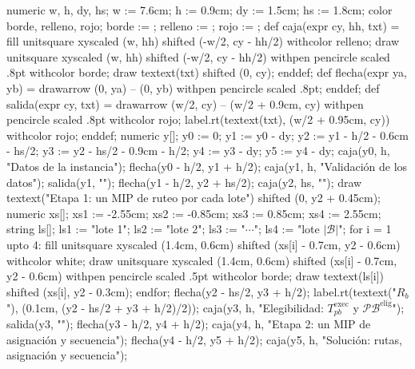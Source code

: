 {\startMPcode
numeric w, h, dy, hs; w := 7.6cm; h := 0.9cm; dy := 1.5cm; hs := 1.8cm;
color borde, relleno, rojo;
borde := ; relleno := ; rojo := ;
def caja(expr cy, hh, txt) =
  fill unitsquare xyscaled (w, hh) shifted (-w/2, cy - hh/2) withcolor relleno;
  draw unitsquare xyscaled (w, hh) shifted (-w/2, cy - hh/2) withpen pencircle scaled .8pt withcolor borde;
  draw textext(txt) shifted (0, cy);
enddef;
def flecha(expr ya, yb) =
  drawarrow (0, ya) -- (0, yb) withpen pencircle scaled .8pt;
enddef;
def salida(expr cy, txt) =
  drawarrow (w/2, cy) -- (w/2 + 0.9cm, cy) withpen pencircle scaled .8pt withcolor rojo;
  label.rt(textext(txt), (w/2 + 0.95cm, cy)) withcolor rojo;
enddef;
numeric y[];
y0 := 0; y1 := y0 - dy; y2 := y1 - h/2 - 0.6cm - hs/2; y3 := y2 - hs/2 - 0.9cm - h/2;
y4 := y3 - dy; y5 := y4 - dy;
caja(y0, h, "Datos de la instancia");
flecha(y0 - h/2, y1 + h/2);
caja(y1, h, "Validación de los datos");
salida(y1, "");
flecha(y1 - h/2, y2 + hs/2);
caja(y2, hs, "");
draw textext("Etapa 1: un MIP de ruteo por cada lote") shifted (0, y2 + 0.45cm);
numeric xs[]; xs1 := -2.55cm; xs2 := -0.85cm; xs3 := 0.85cm; xs4 := 2.55cm;
string ls[]; ls1 := "\tfx lote 1"; ls2 := "\tfx lote 2"; ls3 := "$\cdots$"; ls4 := "\tfx lote $|\mathcal{B}|$";
for i = 1 upto 4:
  fill unitsquare xyscaled (1.4cm, 0.6cm) shifted (xs[i] - 0.7cm, y2 - 0.6cm) withcolor white;
  draw unitsquare xyscaled (1.4cm, 0.6cm) shifted (xs[i] - 0.7cm, y2 - 0.6cm) withpen pencircle scaled .5pt withcolor borde;
  draw textext(ls[i]) shifted (xs[i], y2 - 0.3cm);
endfor;
flecha(y2 - hs/2, y3 + h/2);
label.rt(textext("$R_b$"), (0.1cm, (y2 - hs/2 + y3 + h/2)/2));
caja(y3, h, "Elegibilidad: $T^{\text{exec}}_{pb}$ y $\mathcal{PB}^{\text{elig}}$");
salida(y3, "");
flecha(y3 - h/2, y4 + h/2);
caja(y4, h, "Etapa 2: un MIP de asignación y secuencia");
flecha(y4 - h/2, y5 + h/2);
caja(y5, h, "Solución: rutas, asignación y secuencia");
\stopMPcode}


\stopsubsection
\stopsection

\startsection[title={Espera voluntaria}, reference=sec:espera_voluntaria]

